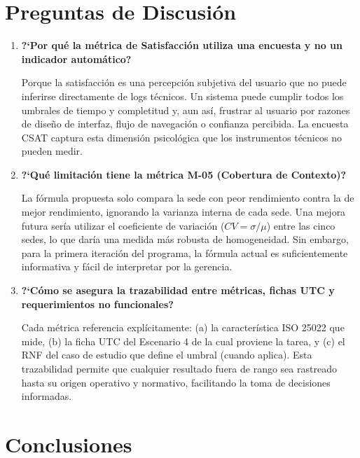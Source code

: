 \documentclass[12pt,a4paper]{article}
\begin{document}
\section{Preguntas de Discusi\'on}

\begin{enumerate}
    \item \textbf{?`Por qu\'e la m\'etrica de Satisfacci\'on utiliza una encuesta y no un indicador autom\'atico?}

    Porque la satisfacci\'on es una percepci\'on subjetiva del usuario que no puede inferirse directamente de logs t\'ecnicos. Un sistema puede cumplir todos los umbrales de tiempo y completitud y, aun as\'i, frustrar al usuario por razones de dise\~no de interfaz, flujo de navegaci\'on o confianza percibida. La encuesta CSAT captura esta dimensi\'on psicol\'ogica que los instrumentos t\'ecnicos no pueden medir.

    \item \textbf{?`Qu\'e limitaci\'on tiene la m\'etrica M-05 (Cobertura de Contexto)?}

    La f\'ormula propuesta solo compara la sede con peor rendimiento contra la de mejor rendimiento, ignorando la varianza interna de cada sede. Una mejora futura ser\'ia utilizar el coeficiente de variaci\'on ($CV = \sigma/\mu$) entre las cinco sedes, lo que dar\'ia una medida m\'as robusta de homogeneidad. Sin embargo, para la primera iteraci\'on del programa, la f\'ormula actual es suficientemente informativa y f\'acil de interpretar por la gerencia.

    \item \textbf{?`C\'omo se asegura la trazabilidad entre m\'etricas, fichas UTC y requerimientos no funcionales?}

    Cada m\'etrica referencia expl\'icitamente: (a) la caracter\'istica ISO 25022 que mide, (b) la ficha UTC del Escenario 4 de la cual proviene la tarea, y (c) el RNF del caso de estudio que define el umbral (cuando aplica). Esta trazabilidad permite que cualquier resultado fuera de rango sea rastreado hasta su origen operativo y normativo, facilitando la toma de decisiones informadas.
\end{enumerate}

\section{Conclusiones}
\end{document}
